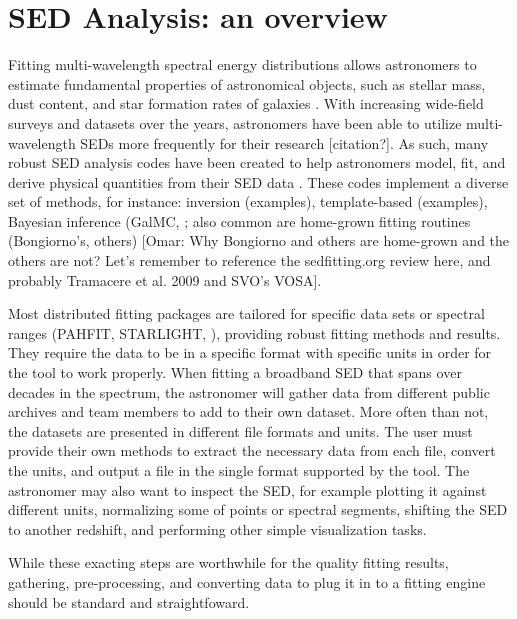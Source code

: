 \section{SED Analysis: an overview}
\label{sec:overview}

Fitting multi-wavelength spectral energy distributions allows astronomers to estimate fundamental properties of astronomical objects, such as stellar mass, dust content, and star formation rates of galaxies \cite{http://adsabs.harvard.edu/abs/1998AJ....115.1329S,http://adsabs.harvard.edu/abs/2001ApJS..137..139S,http://adsabs.harvard.edu/abs/2007ApJS..169..328R}. With increasing wide-field surveys and datasets over the years, astronomers have been able to utilize multi-wavelength SEDs more frequently for their research [citation?]. As such, many robust SED analysis codes have been created to help astronomers model, fit, and derive physical quantities from their SED data \cite{2011Ap&SS.331....1W,2013ARA&A..51..393C}. These codes implement a diverse set of methods, for instance: inversion (examples), template-based (examples), Bayesian inference (GalMC, ; also common are home-grown fitting routines (Bongiorno's, others) [Omar: Why Bongiorno and others are home-grown and the others are not? Let's remember to reference the sedfitting.org review here, and probably Tramacere et al. 2009 and SVO's VOSA]. 

Most distributed fitting packages are tailored for specific data sets or spectral ranges (PAHFIT, STARLIGHT, ), providing robust fitting methods and results. They require the data to be in a specific format with specific units in order for the tool to work properly. When fitting a broadband SED that spans over decades in the spectrum, the astronomer will gather data from different public archives and team members to add to their own dataset. More often than not, the datasets are presented in different file formats and units. The user must provide their own methods to extract the necessary data from each file, convert the units, and output a file in the single format supported by the tool. The astronomer may also want to inspect the SED, for example plotting it against different units, normalizing some of points or spectral segments, shifting the SED to another redshift, and performing other simple visualization tasks.

While these exacting steps are worthwhile for the quality fitting results, gathering, pre-processing, and converting data to plug it in to a fitting engine should be standard and straightfoward.

